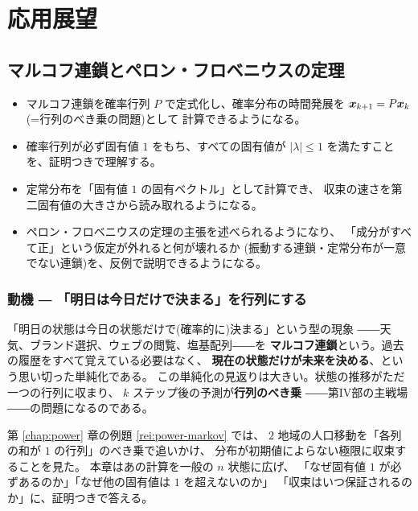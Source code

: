\part{応用展望}

\chapter{マルコフ連鎖とペロン・フロベニウスの定理}\label{chap:markov}

\begin{goal}
\begin{itemize}
\item マルコフ連鎖を確率行列 $P$ で定式化し、確率分布の時間発展を
$\bm{x}_{k+1} = P\bm{x}_k$(=行列のべき乗の問題)として
計算できるようになる。
\item 確率行列が必ず固有値 $1$ をもち、すべての固有値が
$|\lambda| \le 1$ を満たすことを、証明つきで理解する。
\item 定常分布を「固有値 $1$ の固有ベクトル」として計算でき、
収束の速さを第二固有値の大きさから読み取れるようになる。
\item ペロン・フロベニウスの定理の主張を述べられるようになり、
「成分がすべて正」という仮定が外れると何が壊れるか
(振動する連鎖・定常分布が一意でない連鎖)を、反例で説明できるようになる。
\end{itemize}
\end{goal}

\section{動機 ― 「明日は今日だけで決まる」を行列にする}

「明日の状態は今日の状態だけで(確率的に)決まる」という型の現象
――天気、ブランド選択、ウェブの閲覧、塩基配列――を
\textbf{マルコフ連鎖}という。過去の履歴をすべて覚えている必要はなく、
\textbf{現在の状態だけが未来を決める}、という思い切った単純化である。
この単純化の見返りは大きい。状態の推移がただ一つの行列に収まり、
$k$ ステップ後の予測が\textbf{行列のべき乗}
――第IV部の主戦場――の問題になるのである。

第 \ref{chap:power} 章の例題 \ref{rei:power-markov} では、
$2$ 地域の人口移動を「各列の和が $1$ の行列」のべき乗で追いかけ、
分布が初期値によらない極限に収束することを見た。
本章はあの計算を一般の $n$ 状態に広げ、
「なぜ固有値 $1$ が必ずあるのか」「なぜ他の固有値は $1$ を超えないのか」
「収束はいつ保証されるのか」に、証明つきで答える。

